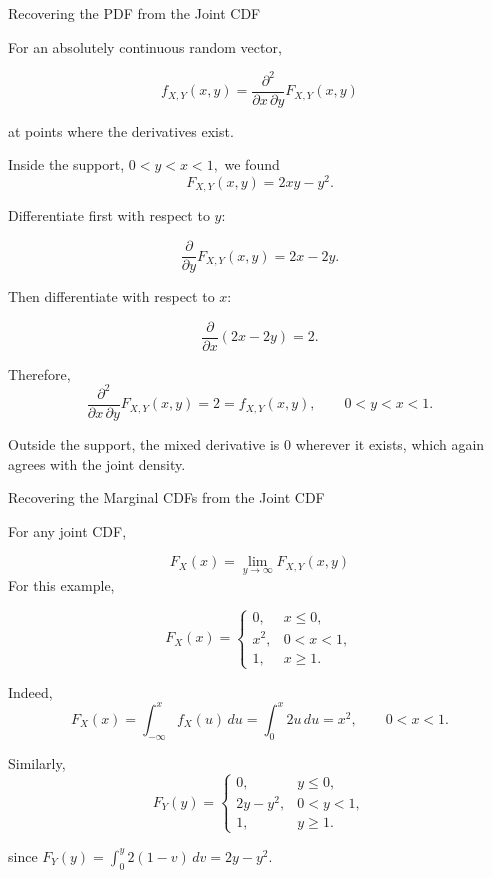 \begin{frame}{Recovering the PDF from the Joint CDF}

For an absolutely continuous random vector,

$$
{
f_{X,Y}(x,y)
=
\frac{\partial^2}{\partial x\,\partial y}
F_{X,Y}(x,y)
}
$$

at points where the derivatives exist.

Inside the support, $0<y<x<1,$ we found
$$
F_{X,Y}(x,y)
=
2xy-y^2.
$$

Differentiate first with respect to $y$:

$$
\frac{\partial}{\partial y}F_{X,Y}(x,y)
=
2x-2y.
$$

Then differentiate with respect to $x$:

$$
\frac{\partial}{\partial x}
\left(2x-2y\right)
=
2.
$$

Therefore,
$$
{
\frac{\partial^2}{\partial x\,\partial y}
F_{X,Y}(x,y)
=
2
=
f_{X,Y}(x,y),
\qquad 0<y<x<1.
}
$$

Outside the support, the mixed derivative is $0$ wherever it exists,
which again agrees with the joint density.

\end{frame}


\begin{frame}{Recovering the Marginal CDFs from the Joint CDF}

For any joint CDF,

$$
{
F_X(x)
=
\lim_{y\to\infty}F_{X,Y}(x,y)
}
$$
For this example,

$$
F_X(x)
=
\begin{cases}
0, & x\le0,\\
x^2, & 0<x<1,\\
1, & x\ge1.
\end{cases}
$$

Indeed,
$$
F_X(x)
=
\int_{-\infty}^x f_X(u)\,du
=
\int_0^x 2u\,du
=
x^2,
\qquad 0<x<1.
$$

Similarly,
$$
F_Y(y)
=
\begin{cases}
0, & y\le0,\\
2y-y^2, & 0<y<1,\\
1, & y\ge1.
\end{cases}
$$

since
$
F_Y(y)
=
\int_0^y 2(1-v)\,dv
=
2y-y^2.
$

\end{frame}

